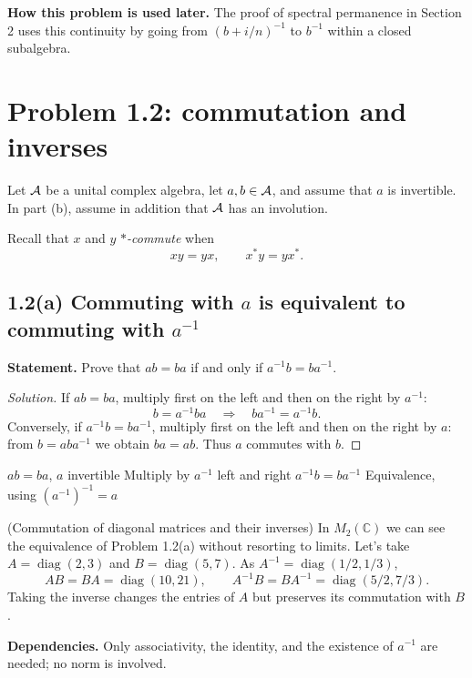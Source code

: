 \noindent\textbf{How this problem is used later.} The proof of spectral permanence in Section 2 uses this continuity by going from $(b+i/n)^{-1}$ to $b^{-1}$ within a closed subalgebra.

\section{Problem 1.2: commutation and inverses}

Let $\mathcal A$ be a unital complex algebra, let $a,b\in\mathcal A$, and assume that $a$ is invertible. In part (b),
assume in addition that $\mathcal A$ has an involution.

Recall that $x$ and $y$ \emph{$*$-commute} when
\[
 xy=yx,
 \qquad x^*y=yx^*.
\]

\subsection*{1.2(a) Commuting with $a$ is equivalent to commuting with $a^{-1}$}

\noindent\textbf{Statement.} Prove that $ab=ba$ if and only if $a^{-1}b=ba^{-1}$.

\begin{proof}[Solution]
If $ab=ba$, multiply first on the left and then on the right by $a^{-1}$:
\[
 b=a^{-1}ba \quad\Longrightarrow\quad ba^{-1}=a^{-1}b.
\]
Conversely, if $a^{-1}b=ba^{-1}$, multiply first on the left and then on the
right by $a$: from $b=aba^{-1}$ we obtain $ba=ab$. Thus $a$ commutes with $b$.
\end{proof}

\proofdiagram
{$ab=ba$, $a$ invertible}
{Multiply by $a^{-1}$ left and right}
{$a^{-1}b=ba^{-1}$}
{Equivalence, using $(a^{-1})^{-1}=a$}

\begin{cthejemplo}{(Commutation of diagonal matrices and their inverses)}
In $M_2(\mathbb C)$ we can see the equivalence of Problem 1.2(a) without resorting to limits.
Let's take $A=\operatorname{diag}(2,3)$ and $B=\operatorname{diag}(5,7)$.
As $A^{-1}=\operatorname{diag}(1/2,1/3)$,
\[
 AB=BA=\operatorname{diag}(10,21),\qquad
 A^{-1}B=BA^{-1}=\operatorname{diag}(5/2,7/3).
\]
Taking the inverse changes the entries of $A$ but preserves its commutation with $B$.
\end{cthejemplo}

\noindent\textbf{Dependencies.} Only associativity, the identity, and the existence of $a^{-1}$ are needed; no norm is involved.

